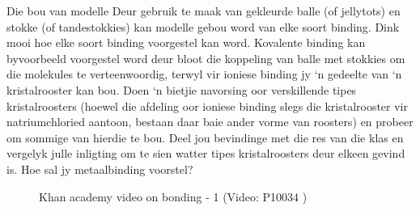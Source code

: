         \label{m38694*id754}
            \begin{activity}{Die bou van modelle}
            \nopagebreak
Deur gebruik te maak van gekleurde balle (of jellytots) en stokke (of tandestokkies) kan modelle gebou word van elke soort binding. Dink mooi hoe elke soort binding voorgestel kan word.  Kovalente binding kan byvoorbeeld voorgestel word deur bloot die koppeling van balle met stokkies om die molekules te verteenwoordig, terwyl vir ioniese binding jy ‘n gedeelte van ‘n kristalrooster kan bou. Doen ‘n  bietjie navorsing oor verskillende tipes kristalroosters (hoewel die afdeling oor ioniese binding slegs die kristalrooster vir natriumchloried aantoon, bestaan daar baie ander vorme van roosters) en probeer om sommige van hierdie te bou. Deel jou bevindinge met die res van die klas en vergelyk julle inligting om te sien watter tipes kristalroosters deur elkeen gevind is. Hoe sal jy metaalbinding voorstel?
\end{activity}
\label{m38694*eip-515}
    \setcounter{subfigure}{0}
	\begin{figure}[H] %
    \textnormal{Khan academy video on bonding - 1}\vspace{.1in} \nopagebreak
  \label{m38694*yt-media1}\label{m38694*yt-video1}
             { (Video:  P10034 )}
      \vspace{2pt}
    \vspace{.1in}
 \end{figure}       \par \label{m38694*secfhsst!!!underscore!!!id617}
